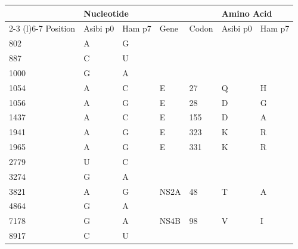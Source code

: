 	\begin{tabular}{@{}lllllll@{}}
		\toprule
		& \multicolumn{2}{l}{Nucleotide} &      &       & \multicolumn{2}{l}{Amino Acid} \\ \cmidrule(lr){2-3} \cmidrule(l){6-7} 
		Position & Asibi p0        & Ham p7       & Gene & Codon & Asibi p0        & Ham p7       \\ \midrule
		802      & A               & G            &      &       &                 &              \\
		\rowcolor[HTML]{FFCCC9} 
		887      & C               & U            &      &       &                 &              \\
		1000     & G               & A            &      &       &                 &              \\
		\rowcolor[HTML]{FFCCC9} 
		1054     & A               & C            & E    & 27    & Q               & H            \\
		1056     & A               & G            & E    & 28    & D               & G            \\
		\rowcolor[HTML]{FFCCC9} 
		1437     & A               & C            & E    & 155   & D               & A            \\
		\rowcolor[HTML]{FFCCC9} 
		1941     & A               & G            & E    & 323   & K               & R            \\
		\rowcolor[HTML]{FFCCC9} 
		1965     & A               & G            & E    & 331   & K               & R            \\
		\rowcolor[HTML]{FFCCC9} 
		2779     & U               & C            &      &       &                 &              \\
		3274     & G               & A            &      &       &                 &              \\
		\rowcolor[HTML]{FFCCC9} 
		3821     & A               & G            & NS2A & 48    & T               & A            \\
		4864     & G               & A            &      &       &                 &              \\
		\rowcolor[HTML]{FFCCC9} 
		7178     & G               & A            & NS4B & 98    & V               & I            \\
		8917     & C               & U            &      &       &                 &              \\ \bottomrule
	\end{tabular}